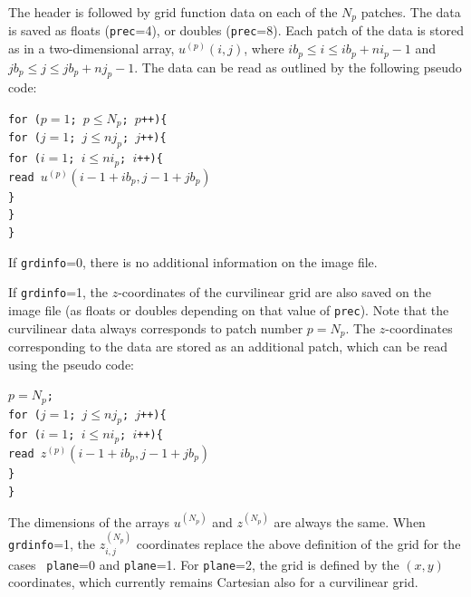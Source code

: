 \documentclass[11pt]{report}
\begin{document}
{The header is followed by grid function data on each of the $N_p$ patches. The data is saved as
floats ({\tt prec}=4), or doubles ({\tt prec}=8). Each patch of the data is stored as in a
two-dimensional array, $u^{(p)}(i,j)$, where $ib_p\leq i \leq ib_p+ni_p-1$ and $jb_p\leq j \leq
	jb_p+nj_p-1$. The data can be read as outlined by the following pseudo code:
\begin{flushleft}
	{\tt for ($p=1$; $p\leq N_p$; $p$++)\{\\
		\hspace{5mm}for ($j=1$; $j\leq nj_p$; $j$++)\{\\
		\hspace{10mm}for ($i=1$; $i\leq ni_p$; $i$++)\{\\
		\hspace{15mm}read $u^{(p)}(i-1+ib_p, j-1+jb_p)$\\
		\hspace{10mm}\}\\
		\hspace{5mm}\}\\
		\}}
\end{flushleft}
If {\tt grdinfo}=0, there is no additional information on the image file.

If {\tt grdinfo}=1, the $z$-coordinates of the curvilinear grid are also saved on the image file
(as floats or doubles depending on that value of {\tt prec}). Note that the curvilinear data always
corresponds to patch number $p=N_p$. The $z$-coordinates corresponding to the data are stored as an
additional patch, which can be read using the pseudo code:
\begin{flushleft}
	{\tt $p=N_p$;\\
		for ($j=1$; $j\leq nj_p$; $j$++)\{\\
		\hspace{5mm}for ($i=1$; $i\leq ni_p$; $i$++)\{\\
		\hspace{10mm}read $z^{(p)}(i-1+ib_p, j-1+jb_p)$\\
		\hspace{5mm}\}\\
		\}}
\end{flushleft}
The dimensions of the arrays $u^{(N_p)}$ and $z^{(N_p)}$ are always the same.  When {\tt grdinfo}=1,
the $z^{(N_p)}_{i,j}$ coordinates replace the above definition of the grid for the cases {\tt
		plane}=0 and {\tt plane}=1. For {\tt plane}=2, the grid is defined by the $(x,y)$ coordinates,
which currently remains Cartesian also for a curvilinear grid.

}
\end{document}
